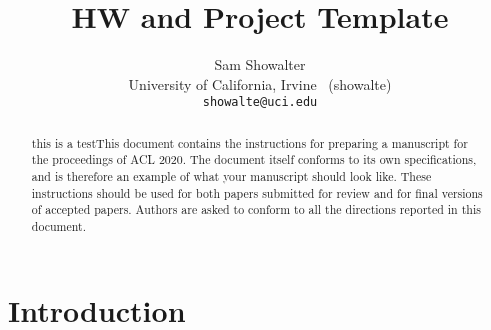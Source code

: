 \documentclass[11pt,a4paper]{article}
\title{HW and Project Template}
\author{Sam Showalter \\
  University of California, Irvine \ (showalte) \\  
\texttt{showalte@uci.edu}}
\date{}
\newcommand\BibTeX{B\textsc{ib}\TeX}
\begin{document}
\maketitle
\begin{abstract}
this is a testThis document contains the instructions for preparing a manuscript for the proceedings of ACL 2020.
The document itself conforms to its own specifications, and is therefore an example of what your manuscript should look like.
These instructions should be used for both papers submitted for review and for final versions of accepted papers.
Authors are asked to conform to all the directions reported in this document.
\end{abstract}



\section{Introduction}





\end{document}
